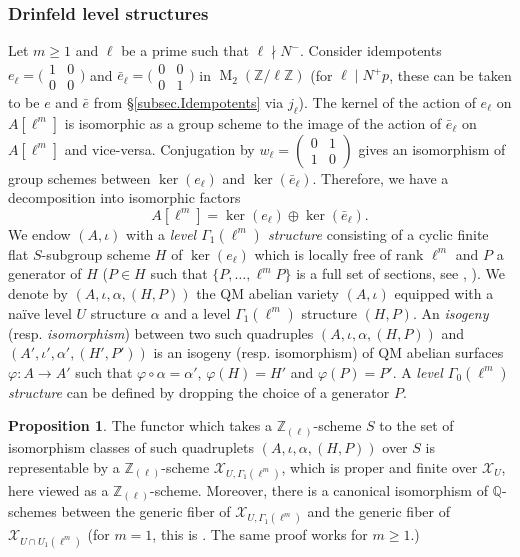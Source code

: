 \documentclass[a4paper]{amsart}
\numberwithin{equation}{section}
\theoremstyle{definition}
\newtheorem{proposition}[theorem]{Proposition}
\newcommand{\Q}{\mathbb{Q}}
\newcommand{\Z}{\mathbb{Z}}
\DeclareMathOperator{\M}{M}
\newcommand{\smallmat}[4]{\bigl(\begin{smallmatrix}#1&#2\\#3&#4\end{smallmatrix}\bigr)}
\begin{document}
\subsubsection{Drinfeld level structures}\label{subsubsec.Drinfeld}
Let $m\ge 1$ and $\ell$ be a prime such that $\ell\nmid N^{-}$. Consider idempotents $e_\ell=\smallmat{1}{0}{0}{0}$ and $\bar{e}_\ell=\smallmat{0}{0}{0}{1}$ in $\M_2(\Z/\ell\Z)$ (for $\ell\mid N^+p$, these can be taken to be $e$ and $\bar{e}$ from \S\ref{subsec.Idempotents} via $j_\ell$). The kernel of the action of $e_\ell$ on $A[\ell^m]$ is isomorphic as a group scheme to the image of the action of $\bar{e}_\ell$ on $A[\ell^m]$ and vice-versa. Conjugation by $w_\ell=\left(\begin{smallmatrix}0 & 1 \\ 1 & 0\end{smallmatrix}\right)$ gives an isomorphism of group schemes between $\ker(e_\ell)$ and $\ker(\bar{e}_\ell)$. Therefore, we have a decomposition into isomorphic factors
\begin{equation}\label{eq.DecompositionApm}
A[\ell^m]=\ker(e_\ell)\oplus \ker(\bar{e}_\ell).
\end{equation}
We endow $(A,\iota)$ with a \emph{level $\Gamma_1(\ell^m)$ structure} consisting of a cyclic finite flat $S$-subgroup scheme $H$ of $\ker(e_\ell)$ which is locally free of rank $\ell^m$ and $P$ a generator of $H$ ($P\in H$ such that $\{P,\dots,\ell^m P\}$ is a full set of sections, see \cite[\S 3]{Buzzard}, \cite[\S 1.8]{KatzMazur}). We denote by $(A,\iota,\alpha,(H,P))$ the QM abelian variety $(A,\iota)$ equipped with a naïve level $U$ structure $\alpha$ and a level $\Gamma_1(\ell^m)$ structure $(H,P)$. An \textit{isogeny} (resp. \textit{isomorphism}) between two such quadruples $(A,\iota,\alpha,(H,P))$ and $(A',\iota',\alpha',(H',P'))$ is an isogeny (resp. isomorphism) of QM abelian surfaces $\varphi\colon A\to A'$ such that $\varphi\circ\alpha=\alpha'$, $\varphi(H)=H'$ and $\varphi(P)=P'$. A \emph{level $\Gamma_0(\ell^m)$ structure} can be defined by dropping the choice of a generator $P$.

\begin{proposition}\label{prop.ModuliDrinfeld}
The functor which takes a $\Z_{(\ell)}$-scheme $S$ to the set of isomorphism classes of such quadruplets $(A,\iota,\alpha,(H,P))$ over $S$ is representable by a $\Z_{(\ell)}$-scheme $\mathcal{X}_{U,\Gamma_1(\ell^m)}$, which is proper and finite over $\mathcal{X}_U$, here viewed as a $\Z_{(\ell)}$-scheme. 
Moreover, there is a canonical isomorphism of $\Q$-schemes between the generic fiber of 
$\mathcal{X}_{U,\Gamma_1(\ell^m)}$ and the generic fiber of 
$\mathcal{X}_{U\cap U_1(\ell^m)}$ (for $m=1$, this is \cite[Proposition 4.1]{Buzzard}. The same proof works for $m\ge 1$.) 
\end{proposition}
\end{document}
